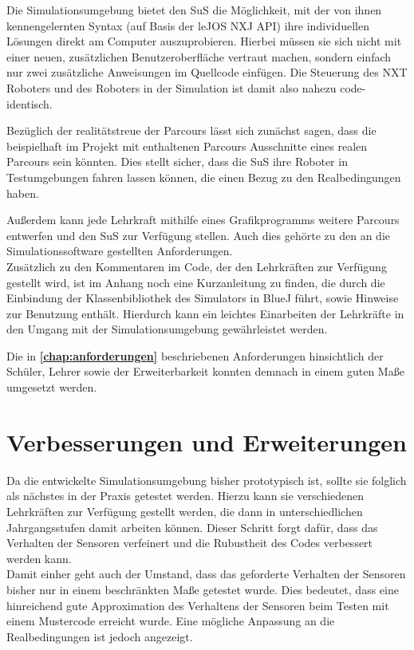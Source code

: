 \documentclass[paper=a4, DIV=calc, BCOR=15mm, twoside=on, onecolumn=on, open = right, titlepage =on, parskip =half, headsepline = on, footsepline = on, chapterprefix = off, appendixprefix = off, fontsize = 12pt, numbers = noenddot, abstract = on]{scrbook}
\begin{document}
Die Simulationsumgebung bietet den SuS die Möglichkeit, mit der von ihnen kennengelernten Syntax (auf Basis der leJOS NXJ API) ihre individuellen Lösungen direkt am Computer auszuprobieren. Hierbei müssen sie sich nicht mit einer neuen, zusätzlichen Benutzeroberfläche vertraut machen, sondern einfach nur zwei zusätzliche Anweisungen im Quellcode einfügen. Die Steuerung des NXT Roboters und des Roboters in der Simulation ist damit also nahezu code-identisch.

Bezüglich der realitätstreue der Parcours lässt sich zunächst sagen, dass die beispielhaft im Projekt mit enthaltenen Parcours Ausschnitte eines realen Parcours sein könnten. Dies stellt sicher, dass die SuS ihre Roboter in Testumgebungen fahren lassen können, die einen Bezug zu den Realbedingungen haben.

Außerdem kann jede Lehrkraft mithilfe eines Grafikprogramms weitere Parcours entwerfen und den SuS zur Verfügung stellen. Auch dies gehörte zu den an die Simulationssoftware gestellten Anforderungen.\\ 
Zusätzlich zu den Kommentaren im Code, der den Lehrkräften zur Verfügung gestellt wird, ist im Anhang noch eine Kurzanleitung zu finden, die durch die Einbindung der Klassenbibliothek des Simulators in BlueJ führt, sowie Hinweise zur Benutzung enthält. Hierdurch kann ein leichtes Einarbeiten der Lehrkräfte in den Umgang mit der Simulationsumgebung gewährleistet werden. 

Die in \textbf{\ref{chap:anforderungen}} beschriebenen Anforderungen hinsichtlich der Schüler, Lehrer sowie der Erweiterbarkeit konnten demnach in einem guten Maße umgesetzt werden. 

\section{Verbesserungen und Erweiterungen}

Da die entwickelte Simulationsumgebung bisher prototypisch ist, sollte sie folglich als nächstes in der Praxis getestet werden. Hierzu kann sie verschiedenen Lehrkräften zur Verfügung gestellt werden, die dann in unterschiedlichen Jahrgangsstufen damit arbeiten können. Dieser Schritt forgt dafür, dass das Verhalten der Sensoren verfeinert und die Rubustheit des Codes verbessert werden kann.\\
Damit einher geht auch der Umstand, dass das geforderte Verhalten der Sensoren bisher nur in einem beschränkten Maße getestet wurde. Dies bedeutet,
dass eine hinreichend gute Approximation des Verhaltens der Sensoren beim
Testen mit einem Mustercode erreicht wurde. Eine mögliche Anpassung an die Realbedingungen ist jedoch angezeigt.
\end{document}
